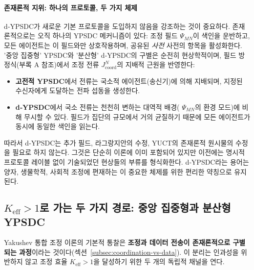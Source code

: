 \documentclass[11pt,a4paper]{article}
\begin{document}
\paragraph*{존재론적 지위: 하나의 프로토콜, 두 가지 체제}

d‑YPSDC가 새로운 기본 프로토콜을 도입하지 않음을 강조하는 것이 중요하다. 존재론적으로는 오직 하나의 YPSDC 메커니즘이 있다: 조정 필드 $\Psi_{MN}$이 색인을 운반하고, 모든 에이전트는 이 필드와만 상호작용하며, 공유된 \emph{사전} 사전의 항목을 활성화한다. '중앙 집중형' YPSDC와 '분산형' d‑YPSDC의 구별은 순전히 현상학적이며, 필드 방정식(부록 A 참조)에서 조정 전류 $J^{N}_{\mathrm{coord}}$의 지배적 근원을 반영한다:
\begin{itemize}[leftmargin=*]
	\item \textbf{고전적 YPSDC}에서 전류는 국소적 에이전트(송신기)에 의해 지배되며, 지정된 수신자에게 도달하는 전파 섭동을 생성한다.
	\item \textbf{d‑YPSDC}에서 국소 전류는 천천히 변하는 대역적 배경( $\Psi_{MN}$의 환경 모드)에 비해 무시할 수 있다. 필드가 집단의 규모에서 거의 균질하기 때문에 모든 에이전트가 동시에 동일한 색인을 읽는다.
\end{itemize}
따라서 d‑YPSDC는 추가 필드, 라그랑지안의 수정, YUCT의 존재론적 원시물의 수정을 필요로 하지 않는다. 그것은 단순히 이론에 이미 포함되어 있지만 이전에는 명시적 프로토콜 레이블 없이 기술되었던 현상들의 부류를 형식화한다. d‑YPSDC라는 용어는 양자, 생물학적, 사회적 조정에 편재하는 이 중요한 체제를 위한 편리한 약칭으로 유지된다.

\subsection{$K_{\mathrm{eff}} > 1$로 가는 두 가지 경로: 중앙 집중형과 분산형 YPSDC}
\label{subsec:two-paths}

Yakushev 통합 조정 이론의 기본적 통찰은 \textbf{조정과 데이터 전송이 존재론적으로 구별되는 과정}이라는 것이다(섹션~\ref{subsec:coordination-vs-data}). 이 분리는 인과성을 위반하지 않고 조정 효율 $K_{\mathrm{eff}} > 1$을 달성하기 위한 두 개의 독립적 채널을 연다.
\end{document}

